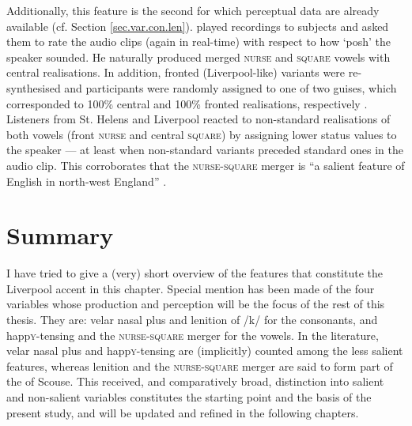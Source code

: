 Additionally, this feature is the second for which perceptual data are already available (cf. Section \ref{sec.var.con.len}).
\textcite{watsonclark2013} played recordings to subjects and asked them to rate the audio clips (again in real-time) with respect to how `posh' the speaker sounded.
He naturally produced merged \textsc{nurse} and \textsc{square} vowels with central realisations.
In addition, fronted (Liverpool-like) variants were re-synthesised and participants were randomly assigned to one of two guises, which corresponded to 100\% central and 100\% fronted realisations, respectively \parencite[cf.][305--306]{watsonclark2013}.
Listeners from St. Helens and Liverpool reacted to non-standard realisations of both vowels (front \textsc{nurse} and central \textsc{square}) by assigning lower status values to the speaker --- at least when non-standard variants preceded standard ones in the audio clip.
This corroborates that the \textsc{nurse}-\textsc{square} merger is ``a salient feature of English in north-west England'' \parencite[cf.][317--320]{watsonclark2013}.

	\section{Summary}

I have tried to give a (very) short overview of the features that constitute the Liverpool accent in this chapter.
Special mention has been made of the four variables whose production and perception will be the focus of the rest of this thesis.
They are: velar nasal plus and lenition of /k/ for the consonants, and happ\textsc{y}-tensing and the \textsc{nurse}-\textsc{square} merger for the vowels.
In the literature, velar nasal plus and happ\textsc{y}-tensing are (implicitly) counted among the less salient features, whereas lenition and the \textsc{nurse}-\textsc{square} merger are said to form part of the  of Scouse.
This received, and comparatively broad, distinction into salient and non-salient variables constitutes the starting point and the basis of the present study, and will be updated and refined in the following chapters.